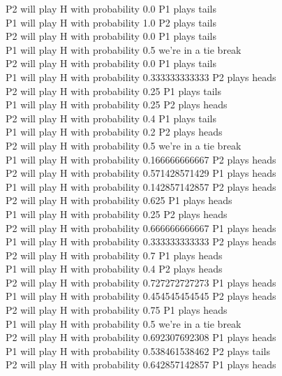 \documentclass[11pt]{article}
\begin{document}
P2 will play H with probability 0.0  P1 plays tails \\
P1 will play H with probability 1.0  P2 plays tails\\
P2 will play H with probability 0.0  P1 plays tails\\
P1 will play H with probability 0.5  we're in a tie break\\
P2 will play H with probability 0.0  P1 plays tails\\
P1 will play H with probability 0.333333333333  P2 plays heads\\
P2 will play H with probability 0.25  P1 plays tails\\
P1 will play H with probability 0.25  P2 plays heads\\
P2 will play H with probability 0.4  P1 plays tails\\
P1 will play H with probability 0.2  P2 plays heads\\
P2 will play H with probability 0.5  we're in a tie break\\
P1 will play H with probability 0.166666666667  P2 plays heads\\
P2 will play H with probability 0.571428571429  P1 plays heads\\
P1 will play H with probability 0.142857142857  P2 plays heads\\
P2 will play H with probability 0.625  P1 plays heads\\
P1 will play H with probability 0.25  P2 plays heads\\
P2 will play H with probability 0.666666666667  P1 plays heads\\
P1 will play H with probability 0.333333333333  P2 plays heads\\
P2 will play H with probability 0.7  P1 plays heads\\
P1 will play H with probability 0.4  P2 plays heads\\
P2 will play H with probability 0.727272727273  P1 plays heads\\
P1 will play H with probability 0.454545454545  P2 plays heads\\
P2 will play H with probability 0.75  P1 plays heads\\
P1 will play H with probability 0.5  we're in a tie break\\
P2 will play H with probability 0.692307692308  P1 plays heads\\
P1 will play H with probability 0.538461538462  P2 plays tails\\
P2 will play H with probability 0.642857142857  P1 plays heads\\
\end{document}
